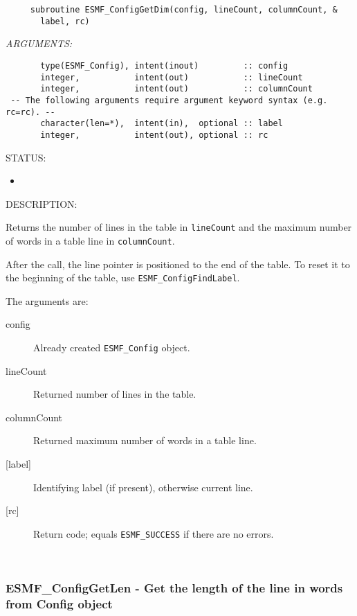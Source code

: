   
\begin{verbatim}     subroutine ESMF_ConfigGetDim(config, lineCount, columnCount, &
       label, rc)
 \end{verbatim}{\em ARGUMENTS:}
\begin{verbatim}       type(ESMF_Config), intent(inout)         :: config
       integer,           intent(out)           :: lineCount
       integer,           intent(out)           :: columnCount
 -- The following arguments require argument keyword syntax (e.g. rc=rc). --
       character(len=*),  intent(in),  optional :: label
       integer,           intent(out), optional :: rc\end{verbatim}
{\sf STATUS:}
   \begin{itemize}
   \item{}
   \end{itemize}
  
{\sf DESCRIPTION:\\ }

 
    Returns the number of lines in the table in {\tt lineCount} and 
    the maximum number of words in a table line in {\tt columnCount}.
  
    After the call, the line pointer is positioned to the end of the table.
    To reset it to the beginning of the table, use {\tt ESMF\_ConfigFindLabel}. 
  
     The arguments are:
     \begin{description}
     \item [config]
       Already created {\tt ESMF\_Config} object.
     \item [lineCount]
       Returned number of lines in the table. 
     \item [columnCount]
       Returned maximum number of words in a table line. 
     \item [{[label]}]
       Identifying label (if present), otherwise current line.
     \item [{[rc]}]
       Return code; equals {\tt ESMF\_SUCCESS} if there are no errors.
     \end{description}
   
 
\mbox{}\hrulefill\ 
 
\subsubsection [ESMF\_ConfigGetLen] {ESMF\_ConfigGetLen - Get the length of the line in words from Config object}


